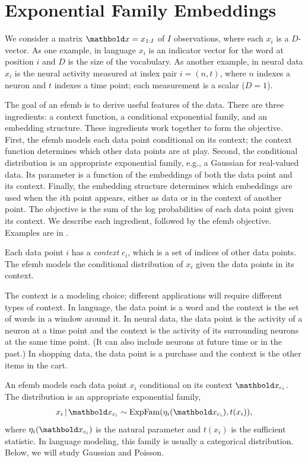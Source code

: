\documentclass[12pt]{article}
\begin{document}
\section{Exponential Family Embeddings}
\glsresetall

We consider a matrix $\mbx = x_{1:I}$ of $I$ observations, where each $x_i$ is a
$D$-vector. As one example, in language $x_i$ is an indicator vector
for the word at position $i$ and $D$ is the size of the vocabulary. As
another example, in neural data $x_i$ is the neural activity measured at index
pair $i = (n,t)$, where $n$ indexes a neuron and $t$ indexes a time
point; each measurement is a scalar ($D=1$).

The goal of an \gls{efemb} is to derive useful features of the data.
There are three ingredients: a context function, a conditional
exponential family, and an embedding structure. These ingredients work
together to form the objective. First, the \gls{efemb} models each
data point conditional on its context; the context function determines
which other data points are at play. Second, the conditional
distribution is an appropriate exponential family, e.g., a Gaussian
for real-valued data. Its parameter is a function of the embeddings of
both the data point and its context. Finally, the embedding structure
determines which embeddings are used when the $i$th point appears,
either as data or in the context of another point.  The objective is
the sum of the log probabilities of each data point given its context.
We describe each ingredient, followed by the \gls{efemb} objective. Examples are in .

 Each data point $i$ has a {\em context} $c_i$,
which is a set of indices of other data points. The \gls{efemb} models
the conditional distribution of $x_i$ given the data points in its
context.

The context is a modeling choice; different applications will require
different types of context. In language, the data point is a word and
the context is the set of words in a window around it. In neural data,
the data point is the activity of a neuron at a time point and the
context is the activity of its surrounding neurons at the same time
point. (It can also include neurons at future time or in the past.) In
shopping data, the data point is a purchase and the context is the
other items in the cart.

 An \gls{efemb} models each
data point $x_i$ conditional on its context $\mbx_{c_i}$. The
distribution is an appropriate exponential family,
\begin{align}
  x_{i} \g \mbx_{c_i} \sim \expfam(\eta_{i}(\mbx_{c_i}), t(x_{i})),
\end{align}
where $\eta_i(\mbx_{c_i})$ is the natural parameter and $t(x_i)$ is
the sufficient statistic. In language modeling, this family is usually
a categorical distribution. Below, we will study Gaussian and Poisson.
\end{document}
